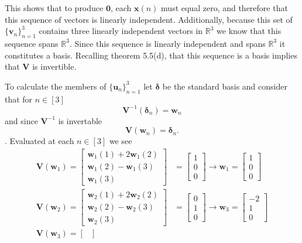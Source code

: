 \documentclass[12pt]{amsart}
\newcommand{\1}{\mathbbm{1}}
\numberwithin{equation}{section}
\numberwithin{Theorem}{section}
\theoremstyle{plain} %
\theoremstyle{definition}
\theoremstyle{remark}
\begin{document}
\begin{enumerate}[1.]
This shows that to produce $\mathbf{0}$, each $\mathbf{x}(n)$ must equal zero, and therefore that this sequence of vectors is linearly independent. 
Additionally, because this set of \(\{\mathbf{v}_{n}\}_{n=1}^{3}\) contains three linearly independent vectors in $\mathbb{R}^3$ we know that this sequence spans $\mathbb{R}^3$. 
Since this sequence is linearly independent and spans $\mathbb{R}^3$ it constitutes a basis. 
Recalling theorem 5.5(d), that this sequence is a basis implies that \(\mathbf{V}\) is invertible.

To calculate the members of \(\{\mathbf{u}_{n}\}_{n=1}^{3}\) let
$\boldsymbol{\delta}$ be the standard basis and
consider that for $n\in[3]$ 
\[
\mathbf{V}^{-1}(\boldsymbol{\delta}_n) = \mathbf{w}_n  
\]
and since $\mathbf{V}^{-1}$ is invertable
\[
\mathbf{V}(\mathbf{w}_n) = \boldsymbol{\delta}_n .
\].
Evaluated at each $n\in[3]$ we see
\begin{align*}
	\mathbf{V}(\mathbf{w}_1) =
	\begin{bmatrix}
		\mathbf{w}_1(1) + 2\mathbf{w}_1(2) \\
		\mathbf{w}_1(2) -  \mathbf{w}_1(3) \\
		\mathbf{w}_1(3)
	\end{bmatrix}
	&= 
	\begin{bmatrix} 1 \\ 0 \\ 0 \end{bmatrix}
	\rightarrow
	\mathbf{w}_1 =
	\begin{bmatrix} 1 \\ 0 \\ 0 \end{bmatrix}
	\\
	\mathbf{V}(\mathbf{w}_2) =
	\begin{bmatrix}
		\mathbf{w}_2(1) + 2\mathbf{w}_2(2) \\
		\mathbf{w}_2(2) -  \mathbf{w}_2(3) \\
		\mathbf{w}_2(3)
	\end{bmatrix}
	&= 
	\begin{bmatrix} 0 \\ 1 \\ 0 \end{bmatrix}
	\rightarrow
	\mathbf{w}_3 =
	\begin{bmatrix} -2 \\ 1 \\ 0 \end{bmatrix}
	\\
	\mathbf{V}(\mathbf{w}_3) =
	\begin{bmatrix}

\end{bmatrix}
\end{align*}
\end{enumerate}
\end{document}
